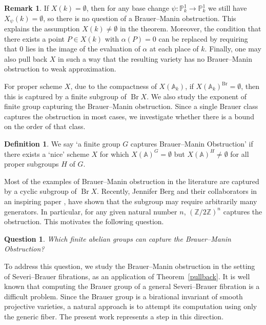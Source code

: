 \documentclass[11pt]{amsart}
\theoremstyle{plain}
\newtheorem{question}[thm]{Question}
\theoremstyle{definition}
\newtheorem{remark}[thm]{Remark}
\newtheorem{definition}[thm]{Definition}
\newcommand{\A}{{\mathbb A}}
\newcommand{\Z}{{\mathbb Z}}
\DeclareMathOperator{\Br}{Br}
\begin{document}
\begin{remark}
If \(X(k) = \emptyset\), then for any base change \(\psi : \mathbb{P}^1_k \to \mathbb{P}^1_k\) we still have \(X_\psi(k) = \emptyset\), so there is no question of a Brauer--Manin obstruction. This explains the assumption \(X(k) \neq \emptyset\) in the theorem. Moreover, the condition that there exists a point \(P \in X(k)\) with \(\alpha(P) = 0\) can be replaced by requiring that \(0\) lies in the image of the evaluation of \(\alpha\) at each place of \(k\). Finally, one may also pull back \(X\) in such a way that the resulting variety has no Brauer--Manin obstruction to weak approximation.
\end{remark}

 For proper scheme $X$, due to the compactness of $X(\A_k)$, if \( X(\A_k)^{\Br} = \emptyset \), then this is captured by a finite subgroup of $\Br X$. We also study the exponent of finite group capturing the Brauer--Manin obstruction. Since a single Brauer class captures the obstruction in most cases, we investigate whether there is a bound on the order of that class.

\begin{definition}
  We say `a finite group $G$ captures Brauer--Manin Obstruction' if there exists a `nice' scheme $X$ for which $X(\A)^G=\emptyset$ but $X(\A)^H \neq\emptyset$ for all proper subgroups $H$ of $G$.
\end{definition}

 Most of the examples of Brauer--Manin obstruction in the literature are captured by a cyclic subgroup of $\Br X$. Recently, Jennifer Berg and their collaborators in an inspiring paper \cite{berg}, have shown that the subgroup may require arbitrarily many generators. In particular, for any given natural number $n$, $(\Z/2\Z)^n$ captures the obstruction. This motivates the following question.

\begin{question}\label{mainquestion}
    Which finite abelian groups can capture the Brauer--Manin Obstruction? 
\end{question}

To address this question, we study the Brauer--Manin obstruction in the setting of Severi--Brauer fibrations, as an application of Theorem~\ref{pullback}. It is well known that computing the Brauer group of a general Severi--Brauer fibration is a difficult problem. Since the Brauer group is a birational invariant of smooth projective varieties, a natural approach is to attempt its computation using only the generic fiber. The present work represents a step in this direction.
\end{document}
